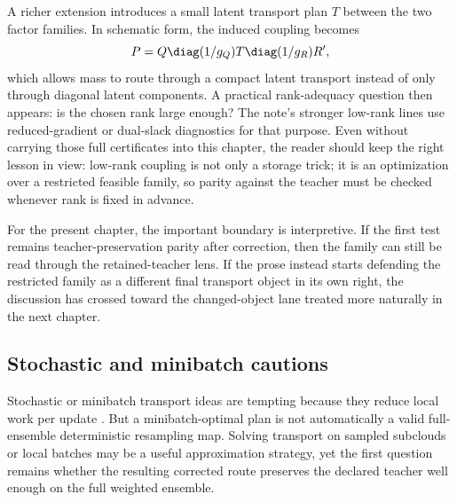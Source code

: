 A richer extension introduces a small latent transport plan \(T\) between the two
factor families.  In schematic form, the induced coupling becomes
\begin{equation}
\label{eq:bf-learned-ot-low-rank-latent}
  P
  =
  Q\diag(1/g_Q)
  T
  \diag(1/g_R)R',
\end{equation}
which allows mass to route through a compact latent transport instead of only
through diagonal latent components.  A practical rank-adequacy question then
appears: is the chosen rank large enough?  The note's stronger low-rank lines use
reduced-gradient or dual-slack diagnostics for that purpose.  Even without carrying
those full certificates into this chapter, the reader should keep the right lesson
in view: low-rank coupling is not only a storage trick; it is an optimization over a
restricted feasible family, so parity against the teacher must be checked whenever
rank is fixed in advance.

For the present chapter, the important boundary is interpretive.  If the first test
remains teacher-preservation parity after correction, then the family can still be
read through the retained-teacher lens.  If the prose instead starts defending the
restricted family as a different final transport object in its own right, the
discussion has crossed toward the changed-object lane treated more naturally in the
next chapter.

\subsection{Stochastic and minibatch cautions}
\label{sec:bf-learned-ot-minibatch}

Stochastic or minibatch transport ideas are tempting because they reduce local work
per update \citep{genevay2016stochastic,genevay2018samplecomplexity,nguyen2022bomb,nguyen2021partialminibatch}.  But a minibatch-optimal plan is not automatically a valid full-
ensemble deterministic resampling map.  Solving transport on sampled subclouds or
local batches may be a useful approximation strategy, yet the first question
remains whether the resulting corrected route preserves the declared teacher well
enough on the full weighted ensemble.


